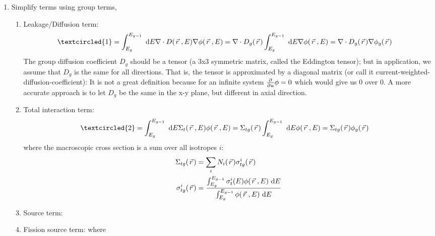 \documentclass{school-22.211-notes}
\begin{document}
\begin{enumerate}
\item Simplify terms using group terms,
  \begin{enumerate}
  \item Leakage/Diffusion term: 
    \begin{align}
      \textcircled{1} &=\int_{E_g}^{E_{g-1}} \dE \divergence D(\vecr, E) \gradient \phi(\vecr, E) =  \divergence D_g(\vecr) \int_{E_g}^{E_{g-1}} \dE \gradient \phi(\vecr, E) = \divergence D_g (\vecr) \gradient \phi_g(\vecr) 
    \end{align}
    The group diffusion coefficient $D_g$ should be a tensor (a 3x3 symmetric matrix, called the Eddington tensor); but in application, we assume that $D_g$ is the same for all directions. That is, the tensor is approximated by a diagonal matrix (or call it current-weighted-diffusion-coefficient): 
    It is not a great definition because for an infinite system $\frac{\partial}{\partial u} \phi = 0$ which would give us 0 over 0. A more accurate approach is to let $D_g$ be the same in the x-y plane, but different in axial direction. 

  \item Total interaction term: 
    \begin{align}
      \textcircled{2} &= \int_{E_g}^{E_{g-1}} \dE \Sigma_t(\vecr, E) \phi(\vecr, E) = \Sigma_{tg}(\vecr) \int_{E_g}^{E_{g-1}} \dE \phi(\vecr, E) = \Sigma_{tg} (\vecr) \phi_g(\vecr) 
    \end{align}
    where the macroscopic cross section is a sum over all isotropes $i$:
    \begin{align}
      \Sigma_{tg}(\left.\vec{r}\right.) &= \displaystyle\sum_{i} N_i(\left.\vec{r}\right.) \sigma_{tg}^i (\left.\vec{r}\right.) \\
      \sigma_{tg}^i (\left.\vec{r}\right.) &= \frac{\int_{E_g}^{E_{g-1}} \sigma_t^i (E) \phi(\left.\vec{r}\right., E) \mbox{ }\mathrm{d} E }{\int_{E_g}^{E_{g-1}} \phi(\left.\vec{r}\right., E) \mbox{ }\mathrm{d} E}
    \end{align}
  \item Source term: 
  \item Fission source term: 
        where 


\end{enumerate}
\end{enumerate}
\end{document}
